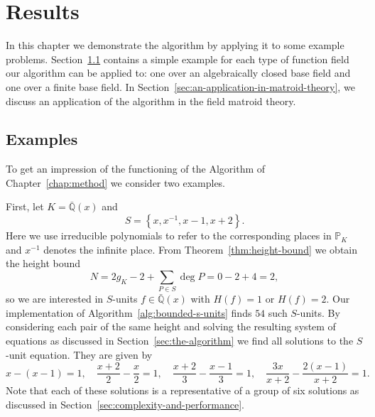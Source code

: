 
\chapter{Results}%
\label{chap:results}

In this chapter we demonstrate the algorithm by applying it to some example problems. Section~\ref{sec:examples} contains a simple example for each type of function field our algorithm can be applied to: one over an algebraically closed base field and one over a finite base field. In Section~\ref{sec:an-application-in-matroid-theory}, we discuss an application of the algorithm in the field matroid theory.

\section{Examples}%
\label{sec:examples}

To get an impression of the functioning of the Algorithm of Chapter~\ref{chap:method} we consider two examples.

\begin{example}%
  \label{ex:algebraically-closed-field}
  First, let \(K = \bar{\mathbb{Q}}(x)\) and
  \[S = \left\{ x, x^{-1}, x - 1, x + 2 \right\}.\]
  Here we use irreducible polynomials to refer to the corresponding places in \(\mathbb{P}_{K}\) and \(x^{-1}\) denotes the infinite place. From Theorem~\ref{thm:height-bound} we obtain the height bound
  \[N = 2g_{K} - 2 + \sum_{P \in S} \deg{P} = 0 - 2 + 4 = 2,\]
  so we are interested in \(S\)-units \(f \in \bar{\mathbb{Q}}(x)\) with \(H(f) = 1\) or \(H(f) = 2\). Our implementation of Algorithm~\ref{alg:bounded-s-units} finds \(54\) such \(S\)-units. By considering each pair of the same height and solving the resulting system of equations as discussed in Section~\ref{sec:the-algorithm} we find all solutions to the \(S\)-unit equation. They are given by
  \[x - (x - 1) = 1, \quad \frac{x + 2}{2} - \frac{x}{2} = 1, \quad \frac{x + 2}{3} - \frac{x - 1}{3} = 1, \quad \frac{3x}{x + 2} - \frac{2(x - 1)}{x + 2} = 1.\]
  Note that each of these solutions is a representative of a group of six solutions as discussed in Section~\ref{sec:complexity-and-performance}.
\end{example}

